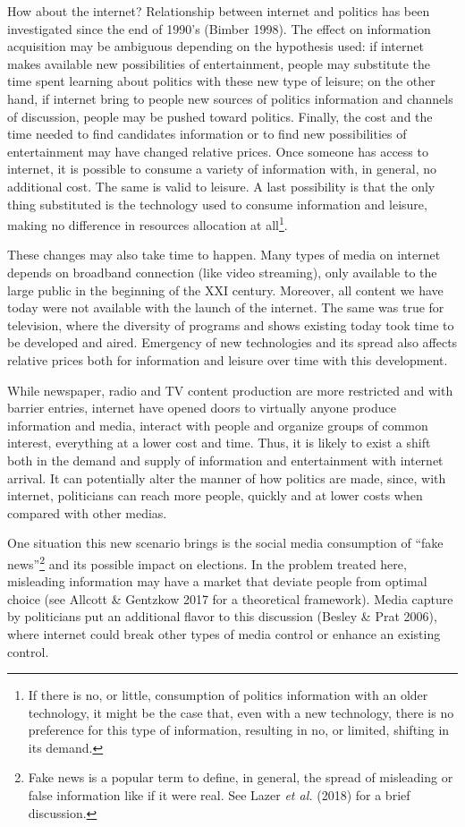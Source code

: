 \documentclass[
  12pt,
]{article}
\begin{document}
How about the internet? Relationship between internet and politics has
been investigated since the end of 1990's (Bimber 1998). The effect on
information acquisition may be ambiguous depending on the hypothesis
used: if internet makes available new possibilities of entertainment,
people may substitute the time spent learning about politics with these
new type of leisure; on the other hand, if internet bring to people new
sources of politics information and channels of discussion, people may
be pushed toward politics. Finally, the cost and the time needed to find
candidates information or to find new possibilities of entertainment may
have changed relative prices. Once someone has access to internet, it is
possible to consume a variety of information with, in general, no
additional cost. The same is valid to leisure. A last possibility is
that the only thing substituted is the technology used to consume
information and leisure, making no difference in resources allocation at
all\footnote{If there is no, or little, consumption of politics
  information with an older technology, it might be the case that, even
  with a new technology, there is no preference for this type of
  information, resulting in no, or limited, shifting in its demand.}.

These changes may also take time to happen. Many types of media on
internet depends on broadband connection (like video streaming), only
available to the large public in the beginning of the XXI century.
Moreover, all content we have today were not available with the launch
of the internet. The same was true for television, where the diversity
of programs and shows existing today took time to be developed and
aired. Emergency of new technologies and its spread also affects
relative prices both for information and leisure over time with this
development.

While newspaper, radio and TV content production are more restricted and
with barrier entries, internet have opened doors to virtually anyone
produce information and media, interact with people and organize groups
of common interest, everything at a lower cost and time. Thus, it is
likely to exist a shift both in the demand and supply of information and
entertainment with internet arrival. It can potentially alter the manner
of how politics are made, since, with internet, politicians can reach
more people, quickly and at lower costs when compared with other medias.

One situation this new scenario brings is the social media consumption
of ``fake news''\footnote{Fake news is a popular term to define, in
  general, the spread of misleading or false information like if it were
  real. See Lazer \emph{et al.} (2018) for a brief discussion.} and its
possible impact on elections. In the problem treated here, misleading
information may have a market that deviate people from optimal choice
(see Allcott \& Gentzkow 2017 for a theoretical framework). Media
capture by politicians put an additional flavor to this discussion
(Besley \& Prat 2006), where internet could break other types of media
control or enhance an existing control.
\end{document}
